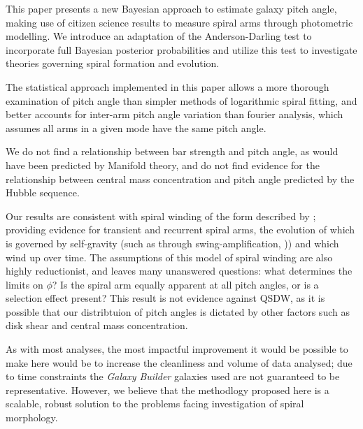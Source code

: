 This paper presents a new Bayesian approach to estimate galaxy pitch angle, making use of citizen science results to measure spiral arms through photometric modelling. We introduce an adaptation of the Anderson-Darling test to incorporate full Bayesian posterior probabilities and utilize this test to investigate theories governing spiral formation and evolution.

The statistical approach implemented in this paper allows a more thorough examination of pitch angle than simpler methods of logarithmic spiral fitting, and better accounts for inter-arm pitch angle variation than fourier analysis, which assumes all arms in a given mode have the same pitch angle.

We do not find a relationship between bar strength and pitch angle, as would have been predicted by Manifold theory, and do not find evidence for the relationship between central mass concentration and pitch angle predicted by the Hubble sequence.

Our results are consistent with spiral winding of the form described by \citet{2019arXiv190910291P}; providing evidence for transient and recurrent spiral arms, the evolution of which is governed by self-gravity (such as through swing-amplification, \citealt{1965MNRAS.130..125G})) and which wind up over time. The assumptions of this model of spiral winding are also highly reductionist, and leaves many unanswered questions: what determines the limits on $\phi$? Is the spiral arm equally apparent at all pitch angles, or is a selection effect present? This result is not evidence against QSDW, as it is possible that our distribtuion of pitch angles is dictated by other factors such as disk shear and central mass concentration.

As with most analyses, the most impactful improvement it would be possible to make here would be to increase the cleanliness and volume of data analysed; due to time constraints the \textit{Galaxy Builder} galaxies used are not guaranteed to be representative. However, we believe that the methodlogy proposed here is a scalable, robust solution to the problems facing investigation of spiral morphology.
